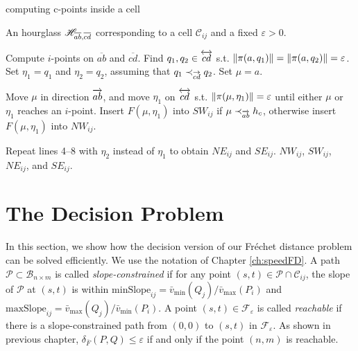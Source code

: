 \documentclass[12pt]{dalthesis}
\newcommand{\lee}{\leqslant}
\newcommand{\eps}{\varepsilon}
\newcommand{\CF}{{\mathscr F}}
\newcommand{\CB}{{\mathscr B}}
\newcommand{\CP}{{\mathscr P}}
\newcommand{\CC}{{\mathscr C}}
\newcommand{\Frechet}{Fr\'echet }
\newcommand{\distFS}{\delta_{\bar{F}}} \newcommand{\distWeakF}{\delta_{\bar{N}}} \newcommand{\distClosedF}{\delta_{\bar{C}}} \newcommand{\distPartialF}{\delta_{\bar{P}}} \newcommand{\distGrpahF}{\delta_{\bar{G}}} \newcommand{\distDisF}{\delta_{dF}} \newcommand{\distGeoF}{\delta_{\hat{F}}} \newcommand{\distHomF}{\delta_{h}} \newcommand{\distC}{\delta_C} \newcommand{\distSetF}{\delta_{\CF}}
\newcommand{\cell}[1]{{\CC_{#1}}}
\newcommand{\BNM}{\CB_{n \times m}}
\newcommand{\Feps}{\CF_\eps}
\newcommand{\Xmin}[2]{{#1}_{\min}(#2)}
\newcommand{\Xmax}[2]{{#1}_{\max}(#2)}
\newcommand{\umin}[1]{\Xmin{\bar{v}}{#1}}
\newcommand{\umax}[1]{\Xmax{\bar{v}}{#1}}
\newcommand{\minS}[1]{\mbox{minSlope}_{#1}}
\newcommand{\maxS}[1]{\mbox{maxSlope}_{#1}}
\newcommand{\Ov}[1]{\overline{#1}}
\begin{document}
\renewcommand{\algorithmicrequire}{\textbf{Input:}}

\begin{algorithm} [h]
\caption {\sc computing c-points inside a cell } \label{alg:ComputeFD}
\begin{algorithmic}[1]
	\vspace{0.5em}
	\baselineskip
	\REQUIRE  An hourglass ${\mathscr H}_{\overline{ab},\overline{cd}}$ corresponding to a cell $\cell{ij}$ and a fixed $\eps > 0$.
	
	\STATE \label{lp:extend} Compute $i$-points on $\Ov{ab}$ and $\Ov{cd}$.
	\STATE \label{lp:q1q2} Find $q_1,q_2 \in \overleftrightarrow{cd}$ s.t. $\| \SP(a,q_1) \| = \|\SP(a,q_2) \| = \eps $.
	\STATE \label{lp:initialization0} Set $\eta_1 = q_1$ and  $\eta_2 = q_2$, assuming that $q_1 \prec_{\overrightarrow{cd}} q_2$.
	\STATE \label{lp:initialization} Set $\mu = a$.
	
		\STATE \label{lp:move} Move $\mu$ in direction $\overrightarrow{ab}$, and 
			move $\eta_1$ on $\overleftrightarrow{cd}$ s.t. $\| \SP(\mu,\eta_1) \| = \eps $ 
			until either $\mu$ or $\eta_1$ reaches an $i$-point.	
		\IF{$F(\mu,\eta_1) \in \cell{ij}$}
		\STATE Insert $F(\mu,\eta_1)$ into $SW_{ij}$ if  $\mu \prec_{\overrightarrow{ab}} h_c$, 
			otherwise  insert $F(\mu,\eta_1)$ into $NW_{ij}$.
		\ENDIF
	\ENDWHILE
	
	\STATE Repeat lines 4--8 with $\eta_2$ instead of $\eta_1$ to obtain $NE_{ij}$ and $SE_{ij}$.
	\RETURN $NW_{ij}$, $SW_{ij}$, $NE_{ij}$, and $SE_{ij}$.
\end{algorithmic}
\end{algorithm}









\section{The Decision Problem} \label{sec:decision}

In this section, we show how the decision version of 
our \Frechet distance problem can be solved efficiently.
We use the notation of Chapter \ref{ch:speedFD}.
A path $\CP \subset \BNM$ is called {\em slope-constrained\/}
if for any point $(s,t) \in \CP \cap \cell{ij}$,
the slope of $\CP$ at $(s,t)$ is within 
$\minS{ij} = {{\umin{Q_j}}/{\umax{P_i}}}$ and $\maxS{ij} = {{\umax{Q_j}}/{\umin{P_i}}}$.
A point $(s,t) \in \Feps$ is called {\em reachable\/} 
if there is a slope-constrained path from $(0,0)$ to $(s,t)$ in $\Feps$.
As shown in previous chapter, $\distFS(P,Q) \lee \eps$ if and only if the point $(n,m)$ is reachable.
\end{document}

